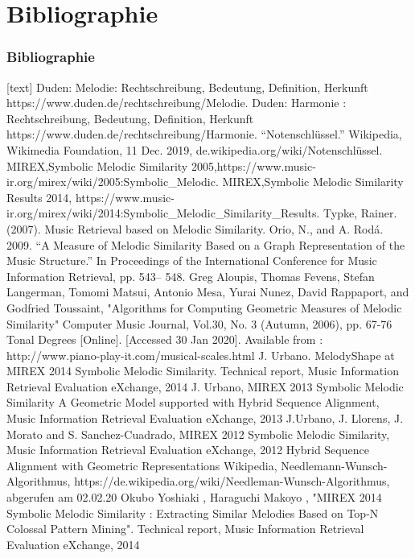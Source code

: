 \documentclass{beamer}
\begin{document}
	\section{Bibliographie}
	\begin{frame}[allowframebreaks]
		\frametitle{Bibliographie}
		\begin{thebibliography}{14}
			[text]
			 Duden: Melodie: Rechtschreibung, Bedeutung, Definition, Herkunft
			https://www.duden.de/rechtschreibung/Melodie.
			 Duden: Harmonie : Rechtschreibung, Bedeutung, Definition, Herkunft
			https://www.duden.de/rechtschreibung/Harmonie.
			 “Notenschlüssel.” Wikipedia, Wikimedia Foundation, 11 Dec. 2019, de.wikipedia.org/wiki/Notenschlüssel.
			 MIREX,Symbolic Melodic Similarity 2005,https://www.music-ir.org/mirex/wiki/2005:Symbolic\_Melodic.
			 MIREX,Symbolic Melodic Similarity Results 2014, https://www.music-ir.org/mirex/wiki/2014:Symbolic\_Melodic\_Similarity\_Results.
			 Typke, Rainer. (2007). Music Retrieval based on Melodic Similarity.
			 Orio, N., and A. Rodá. 2009. “A Measure of Melodic Similarity Based on a Graph Representation of the Music Structure.” In Proceedings of the International Conference for Music Information Retrieval, pp. 543– 548.
			 Greg Aloupis, Thomas Fevens, Stefan Langerman, Tomomi Matsui, Antonio Mesa, Yurai Nunez, David Rappaport, and Godfried Toussaint, "Algorithms for Computing Geometric Measures of Melodic Similarity" Computer Music Journal, Vol.30, No. 3 (Autumn, 2006), pp. 67-76
			 Tonal Degrees [Online]. [Accessed 30 Jan 2020]. Available from : http://www.piano-play-it.com/musical-scales.html
			 J. Urbano. MelodyShape at MIREX 2014 Symbolic
            Melodic Similarity. Technical report, Music Information Retrieval Evaluation eXchange, 2014
             J. Urbano, MIREX 2013 Symbolic Melodic Similarity  A Geometric Model supported with Hybrid Sequence Alignment, Music Information Retrieval Evaluation eXchange, 2013
             J.Urbano, J. Llorens, J. Morato and S. Sanchez-Cuadrado, MIREX 2012 Symbolic Melodic Similarity, Music Information Retrieval Evaluation eXchange, 2012
            Hybrid Sequence Alignment with Geometric Representations
           	 Wikipedia, Needlemann-Wunsch-Algorithmus, https://de.wikipedia.org/wiki/Needleman-Wunsch-Algorithmus, abgerufen am 02.02.20
           	 Okubo Yoshiaki , Haraguchi Makoyo , "MIREX 2014 Symbolic Melodic Similarity : Extracting Similar Melodies Based on Top-N Colossal Pattern Mining". Technical report, Music Information Retrieval Evaluation eXchange, 2014
		\end{thebibliography}
	\end{frame}
\end{document}
